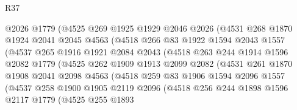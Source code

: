 \begin{lexlean}{R37}
\begin{coremodule}
                    @2026
                    @1779
                    (@4525
                      @269
                      @1925
                      @1929
                      @2046
                      @2026
                      (@4531
                        @268
                        @1870
                        @1924
                        @2041
                        @2045
                        @4563
                        (@4518
                          @266
                          @83
                          @1922
                          @1594
                          @2043
                          @1557
                          (@4537
                            @265
                            @1916
                            @1921
                            @2084
                            @2043
                            (@4518
                              @263
                              @244
                              @1914
                              @1596
                              @2082
                              @1779
                              (@4525
                                @262
                                @1909
                                @1913
                                @2099
                                @2082
                                (@4531
                                  @261
                                  @1870
                                  @1908
                                  @2041
                                  @2098
                                  @4563
                                  (@4518
                                    @259
                                    @83
                                    @1906
                                    @1594
                                    @2096
                                    @1557
                                    (@4537
                                      @258
                                      @1900
                                      @1905
                                      @2119
                                      @2096
                                      (@4518
                                        @256
                                        @244
                                        @1898
                                        @1596
                                        @2117
                                        @1779
                                        (@4525
                                          @255
                                          @1893

\end{coremodule}
\end{lexlean}
